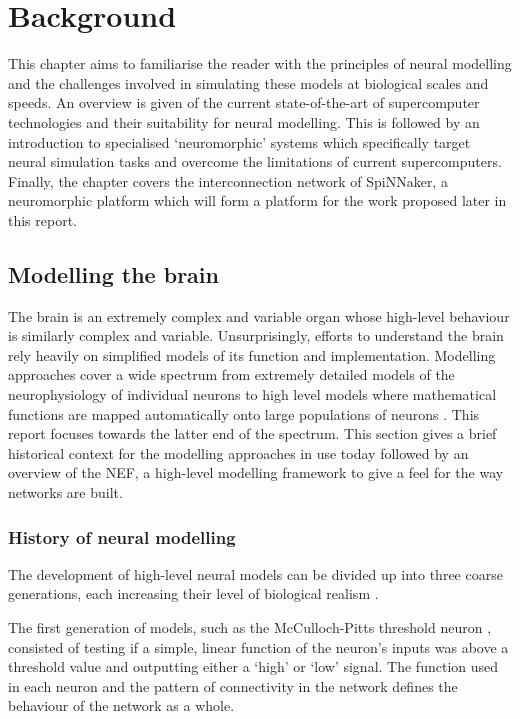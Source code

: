 \chapter{Background}
	
	\label{sec:background}
	
	This chapter aims to familiarise the reader with the principles of neural
	modelling and the challenges involved in simulating these models at biological
	scales and speeds. An overview is given of the current state-of-the-art of
	supercomputer technologies and their suitability for neural modelling. This is
	followed by an introduction to specialised `neuromorphic' systems which
	specifically target neural simulation tasks and overcome the limitations of
	current supercomputers. Finally, the chapter covers the interconnection
	network of SpiNNaker, a neuromorphic platform which will form a platform for
	the work proposed later in this report.
	
	\section{Modelling the brain}
		
		
		The brain is an extremely complex and variable organ whose high-level
		behaviour is similarly complex and variable. Unsurprisingly, efforts to
		understand the brain rely heavily on simplified models of its function and
		implementation. Modelling approaches cover a wide spectrum from extremely
		detailed models of the neurophysiology of individual neurons
		\cite{carnevale06} to high level models where mathematical functions are
		mapped automatically onto large populations of neurons \cite{eliasmith04}.
		This report focuses towards the latter end of the spectrum. This section
		gives a brief historical context for the modelling approaches in use today
		followed by an overview of the NEF, a high-level modelling framework to give
		a feel for the way networks are built.
		
		\subsection{History of neural modelling}
			
			The development of high-level neural models can be divided up into three
			coarse generations, each increasing their level of biological realism
			\cite{vainbrand11}.
			
			The first generation of models, such as the McCulloch-Pitts threshold
			neuron \cite{mcculloch43}, consisted of testing if a simple, linear
			function of the neuron's inputs was above a threshold value and outputting
			either a `high' or `low' signal. The function used in each neuron and the
			pattern of connectivity in the network defines the behaviour of the
			network as a whole.
			
